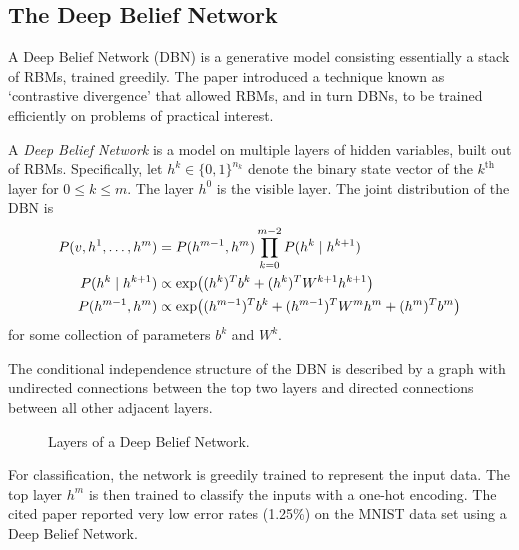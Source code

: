 \documentclass[11pt,titlepage]{article}
\numberwithin{equation}{section}
\begin{document}
\subsection{The Deep Belief Network}
    A Deep Belief Network (DBN) is a generative model consisting essentially a
    stack of RBMs, trained greedily.  The paper \cite{Hin07} introduced a
    technique known as `contrastive divergence' that allowed RBMs, and in turn
    DBNs, to be trained efficiently on problems of practical interest.
    \begin{definition}
    A \emph{Deep Belief Network} is a model on multiple layers of hidden
    variables, built out of RBMs.  Specifically, let $h^k \in \{0,1\}^{n_k}$
    denote the binary state vector of the $k^{\text{th}}$ layer for $0 \le k \le
    m$.  The layer $h^0$ is the visible layer.  The joint distribution of the
    DBN is
    \begin{align*}
        P(v,h^1, \ldots, h^m) &= P(h^{m-1}, h^m) \prod_{k=0}^{m-2} P(h^k \mid h^{k+1})\\
        P(h^k\mid h^{k+1}) &\propto \exp\pdil*{(h^k)^Tb^k + (h^k)^T W^{k+1} h^{k+1}}\\
        P(h^{m-1}, h^{m}) &\propto  \exp\pdil*{(h^{m-1})^T b^k + (h^{m-1})^T W^m
        h^m + (h^m)^T b^m}
    \end{align*}
    for some collection of parameters $b^k$ and $W^k$.
    \end{definition}

    The conditional independence structure of the DBN is described by a graph
    with undirected connections between the top two layers and directed
    connections between all other adjacent layers.
    \begin{figure}[H]
        \centering
        \caption{Layers of a Deep Belief Network.}
    \end{figure}
    \noindent For classification, the network is greedily trained to represent
    the input data.  The top layer $h^m$ is then trained to classify the inputs
    with a one-hot encoding.  The cited paper reported very low error rates
    (1.25\%) on the MNIST data set using a Deep Belief Network.



\end{document}
